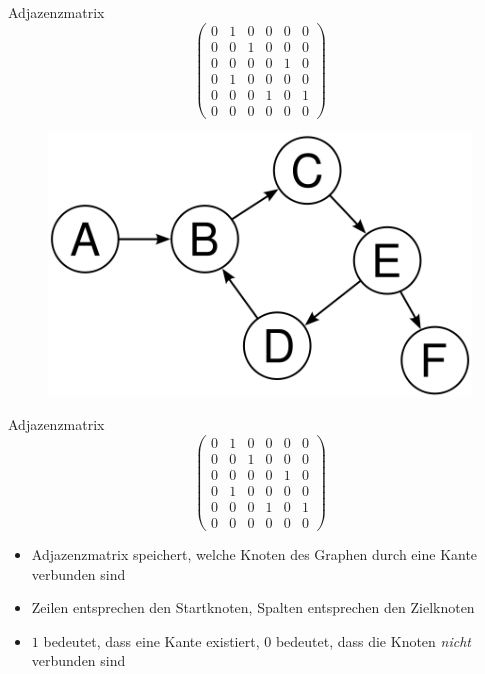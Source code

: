 \documentclass[18pt]{beamer}
\begin{document}
\begin{frame}{Adjazenzmatrix}
    \[
    \left(
    \begin{array}{cccccc}
        0 & 1 & 0 & 0 & 0 & 0 \\
        0 & 0 & 1 & 0 & 0 & 0 \\
        0 & 0 & 0 & 0 & 1 & 0 \\
        0 & 1 & 0 & 0 & 0 & 0 \\
        0 & 0 & 0 & 1 & 0 & 1 \\
        0 & 0 & 0 & 0 & 0 & 0
    \end{array}
    \right)
    \]

    \begin{figure}
        \includegraphics[scale=.3]{img/graph.png}
    \end{figure}

\end{frame}


\begin{frame}{Adjazenzmatrix}
    \[
    \left(
    \begin{array}{cccccc}
        0 & 1 & 0 & 0 & 0 & 0 \\
        0 & 0 & 1 & 0 & 0 & 0 \\
        0 & 0 & 0 & 0 & 1 & 0 \\
        0 & 1 & 0 & 0 & 0 & 0 \\
        0 & 0 & 0 & 1 & 0 & 1 \\
        0 & 0 & 0 & 0 & 0 & 0
    \end{array}
    \right)
    \]

    \begin{itemize}
        \item Adjazenzmatrix speichert, welche Knoten des Graphen durch eine Kante verbunden sind
        \item Zeilen entsprechen den Startknoten, Spalten entsprechen den Zielknoten
        \item $1$ bedeutet, dass eine Kante existiert, $0$ bedeutet, dass die Knoten \textit{nicht} verbunden sind
    \end{itemize}

\end{frame}
\end{document}
